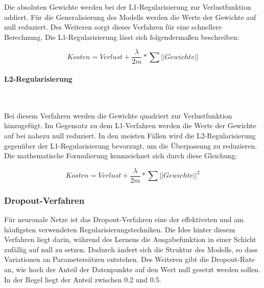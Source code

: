 Die absoluten Gewichte werden bei der L1-Regularisierung zur Verlustfunktion addiert. Für die Generalisierung des Modells werden die Werte der Gewichte auf null reduziert. Des Weiteren sorgt dieses Verfahren für eine schnellere Berechnung\cite{Nelli2018}.
\newline
Die L1-Regularisierung lässt sich folgendermaßen beschreiben:

\begin{equation}
	Kosten = Verlust + \frac{\lambda}{2m}*\sum\vert\vert Gewichte\vert\vert
\end{equation}



\paragraph{L2-Regularisierung}
~\newline

Bei diesem Verfahren werden die Gewichte quadriert zur Verlustfunktion hinzugefügt. Im Gegensatz zu dem L1-Verfahren werden die Werte der Gewichte auf bei nahezu null reduziert. In den meisten Fällen wird die L2-Regularisierung gegenüber der L1-Regularisierung bevorzugt, um die Überpassung zu reduzieren\cite{Nelli2018}.
\newline
Die mathematische Formulierung kennzeichnet sich durch diese Gleichung:

\begin{equation}
Kosten = Verlust + \frac{\lambda}{2m}*\sum\vert\vert Gewichte\vert\vert^2
\end{equation}

\subsubsection{Dropout-Verfahren}

Für neuronale Netze ist das Dropout-Verfahren eine der effektivsten und am häufigsten verwendeten Regularisierungstechniken. Die Idee hinter diesem Verfahren liegt darin, während des Lernens die Ausgabefunktion in einer Schicht zufällig auf null zu setzen\cite{francois}. Dadurch ändert sich die Struktur des Modells, so dass Variationen an Parametersätzen entstehen\cite{Gonzalez2018}. Des Weiteren gibt die Dropout-Rate an, wie hoch der Anteil der Datenpunkte auf den Wert null gesetzt werden sollen. In der Regel liegt der Anteil zwischen 0.2 und 0.5\cite{francois, Moolayil2018}.

